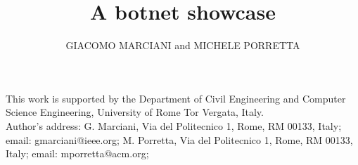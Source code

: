 \documentclass[prodmode,gmportfolio]{acmlarge}
\title{A botnet showcase}
\author{GIACOMO MARCIANI and MICHELE PORRETTA \affil{University of Rome Tor Vergata}}
\numberwithin{equation}{section}
\begin{document}
	
\begin{bottomstuff}
	This work is supported by the Department of Civil Engineering and Computer Science
	Engineering, University of Rome Tor Vergata, Italy.\\
	Author's address: 
	G. Marciani, Via del Politecnico 1, Rome, RM 00133, Italy;
	email: gmarciani@ieee.org;
	M. Porretta, Via del Politecnico 1, Rome, RM 00133, Italy;
	email: mporretta@acm.org;
\end{bottomstuff}

\maketitle








\elecappendix

\end{document}
